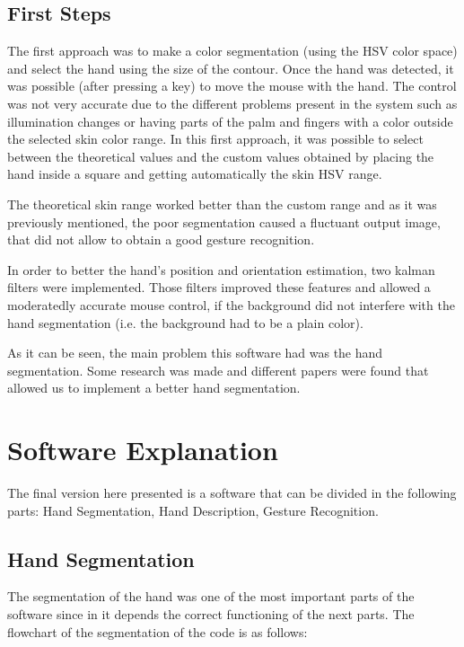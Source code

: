 \documentclass{article}
\begin{document}
\subsection{First Steps}
The first approach was to make a color segmentation (using the HSV color space) and select the hand using the size of the contour. Once the hand was detected, it was possible (after pressing a key) to move the mouse with the hand. The control was not very accurate due to the different problems present in the system such as illumination changes or having parts of the palm and fingers with a color outside the selected skin color range. In this first approach, it was possible to select between the theoretical values and the custom values obtained by placing the hand inside a square and getting automatically the skin HSV range. 

The theoretical skin range worked better than the custom range and as it was previously mentioned, the poor segmentation caused a fluctuant output image, that did not allow to obtain a good gesture recognition.   

In order to better the hand's position and orientation estimation, two kalman filters were implemented. Those filters improved these features and allowed a moderatedly accurate mouse control, if the background did not interfere with the hand segmentation (i.e. the background had to be a plain color). 

As it can be seen, the main problem this software had was the hand segmentation. Some research was made and different papers were found that allowed us to implement a better hand segmentation. 
  
\section{Software Explanation}

The final version here presented is a software that can be divided in the following parts: Hand Segmentation, Hand Description, Gesture Recognition.
\subsection{Hand Segmentation}
The segmentation of the hand was one of the most important parts of the software since in it depends the correct functioning of the next parts. 
The flowchart of the segmentation of the code is as follows: 
\end{document}
